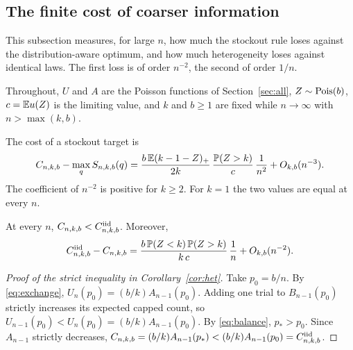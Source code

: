 \subsection{The finite cost of coarser information}\label{sec:secondorder}
This subsection measures, for large $n$, how much the stockout rule loses against the distribution-aware optimum, and how much heterogeneity loses against identical laws. The first loss is of order $n^{-2}$, the second of order $1/n$.

Throughout, $U$ and $A$ are the Poisson functions of Section~\ref{sec:all}, $Z\sim\operatorname{Pois}(b)$, $c=\mathbb E u(Z)$ is the limiting value, and $k$ and $b\ge1$ are fixed while $n\to\infty$ with $n>\max(k,b)$.

\begin{cor}\label{cor:gap}
The cost of a stockout target is
\[
 C_{n,k,b}-\max_q S_{n,k,b}(q)
 =\frac{b\,\mathbb E(k-1-Z)_+}{2k}\,
   \frac{\mathbb P(Z>k)}{c}\,\frac{1}{n^2}+O_{k,b}(n^{-3}).
\]
The coefficient of $n^{-2}$ is positive for $k\ge2$. For $k=1$ the two values are equal at every $n$.
\end{cor}

\begin{cor}\label{cor:het}
At every $n$, $C_{n,k,b}<C^{\rm iid}_{n,k,b}$. Moreover,
\[
 C^{\rm iid}_{n,k,b}-C_{n,k,b}=\frac{b\,\mathbb P(Z<k)\,\mathbb P(Z>k)}{k\,c}\,\frac1n+O_{k,b}(n^{-2}).
\]
\end{cor}

\begin{proof}[Proof of the strict inequality in Corollary~\ref{cor:het}]
Take $p_0=b/n$. By \eqref{eq:exchange}, $U_n(p_0)=(b/k)A_{n-1}(p_0)$. Adding one trial to $B_{n-1}(p_0)$ strictly increases its expected capped count, so $U_{n-1}(p_0)<U_n(p_0)=(b/k)A_{n-1}(p_0)$. By \eqref{eq:balance}, $p_*>p_0$. Since $A_{n-1}$ strictly decreases, $C_{n,k,b}=(b/k)A_{n-1}(p_*)<(b/k)A_{n-1}(p_0)=C^{\rm iid}_{n,k,b}$.
\end{proof}

